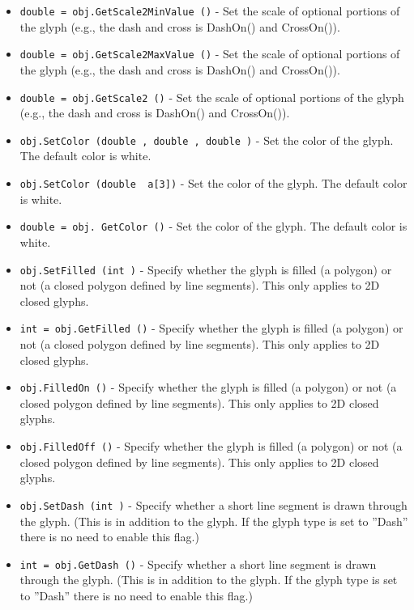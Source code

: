 \begin{itemize}
\item  \verb|double = obj.GetScale2MinValue ()| -  Set the scale of optional portions of the glyph (e.g., the
 dash and cross is DashOn() and CrossOn()).

\item  \verb|double = obj.GetScale2MaxValue ()| -  Set the scale of optional portions of the glyph (e.g., the
 dash and cross is DashOn() and CrossOn()).

\item  \verb|double = obj.GetScale2 ()| -  Set the scale of optional portions of the glyph (e.g., the
 dash and cross is DashOn() and CrossOn()).

\item  \verb|obj.SetColor (double , double , double )| -  Set the color of the glyph. The default color is white.

\item  \verb|obj.SetColor (double  a[3])| -  Set the color of the glyph. The default color is white.

\item  \verb|double = obj. GetColor ()| -  Set the color of the glyph. The default color is white.

\item  \verb|obj.SetFilled (int )| -  Specify whether the glyph is filled (a polygon) or not (a
 closed polygon defined by line segments). This only applies
 to 2D closed glyphs.

\item  \verb|int = obj.GetFilled ()| -  Specify whether the glyph is filled (a polygon) or not (a
 closed polygon defined by line segments). This only applies
 to 2D closed glyphs.

\item  \verb|obj.FilledOn ()| -  Specify whether the glyph is filled (a polygon) or not (a
 closed polygon defined by line segments). This only applies
 to 2D closed glyphs.

\item  \verb|obj.FilledOff ()| -  Specify whether the glyph is filled (a polygon) or not (a
 closed polygon defined by line segments). This only applies
 to 2D closed glyphs.

\item  \verb|obj.SetDash (int )| -  Specify whether a short line segment is drawn through the
 glyph. (This is in addition to the glyph. If the glyph type
 is set to ''Dash'' there is no need to enable this flag.)

\item  \verb|int = obj.GetDash ()| -  Specify whether a short line segment is drawn through the
 glyph. (This is in addition to the glyph. If the glyph type
 is set to ''Dash'' there is no need to enable this flag.)


\end{itemize}
